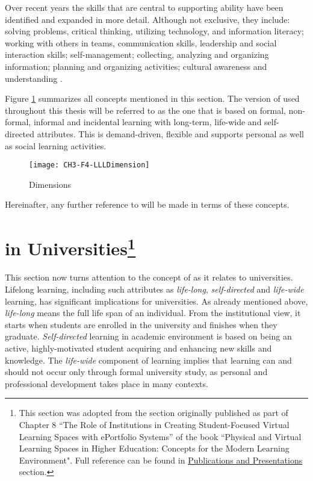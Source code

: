 Over recent years the skills that are central to supporting \LLLs ability have
been identified and expanded in more detail. Although not exclusive, they
include: solving problems, critical thinking, utilizing technology, and
information literacy; working with others in teams, communication skills,
leadership and social interaction skills; self-management; collecting, analyzing
and organizing information; planning and organizing activities; cultural
awareness and understanding \citep{Brooks2008,Heinrich2007,Otala1997,Pitman2009}. 

Figure \ref{fig:llldim} summarizes all concepts mentioned in this section.
The version of \LLLs used throughout this thesis will be referred to as the one
that is based on formal, non-formal, informal and incidental learning with
long-term, life-wide and self-directed attributes. This \LLLs is demand-driven,
flexible and supports personal as well as social learning activities.

\begin{figure}[htb]
\centering
\texttt{[image: CH3-F4-LLLDimension]}
\caption{\LLLc Dimensions}
\label{fig:llldim}
\end{figure}

\FloatBarrier

Hereinafter, any further reference to \LLLs will be made in terms of these
concepts.

\section[\LLLc in Universities]{\LLLc in Universities\footnote{This section was
adopted from the section originally published as part of Chapter 8 ``The Role of
Institutions in Creating Student-Focused Virtual Learning Spaces with ePortfolio
Systems'' of the book ``Physical and Virtual Learning Spaces in Higher
Education: Concepts for the Modern Learning Environment". Full reference can be
found in \hyperref[sec:pub]{Publications and Presentations} section.} }

\label{sec:uni}

This section now turns attention to the concept of \LLLs as it relates to
universities. Lifelong learning, including such attributes as
\textit{life-long}, \textit{self-directed} and \textit{life-wide} learning, has
significant implications for universities. As already mentioned above,
\textit{life-long} means the full life span of an individual. From the
institutional view, it starts when students are enrolled in the university and
finishes when they graduate. \textit{Self-directed} learning in academic
environment is based on being an active, highly-motivated student acquiring and
enhancing new skills and knowledge. The \textit{life-wide} component of learning
implies that learning can and should not occur only through formal university
study, as personal and professional development takes place in many contexts. 

